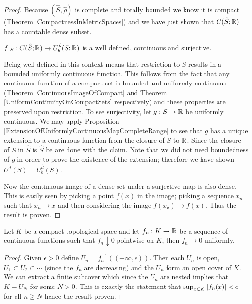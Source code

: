 \begin{proof}
Because $(\hat{S},\hat{\rho})$ is complete and totally bounded we know
it is compact (Theorem \ref{CompactnessInMetricSpaces}) and we have
just shown that $C(\hat{S} ; \mathbb{R})$ has a countable dense subset.

\begin{clm}$f\vert_S : C(\hat{S} ; \mathbb{R}) \to U_b^{\hat{\rho}}(S ;
\mathbb{R})$ is a well defined, continuous and surjective.
\end{clm}

Being well defined in this context means that restriction to $S$
results in a bounded uniformly continuous function.  This follows
from the fact that any continuous function of a compact set is bounded
and uniformly continuous (Theorem \ref{ContinuousImageOfCompact} and
Theorem \ref{UniformContinuityOnCompactSets} respectively) and these
properties are preserved upon restriction.  To see surjectivity, let
$g : S \to \mathbb{R}$ be uniformly continuous.  We may apply Proposition
\ref{ExtensionOfUniformlyContinuousMapCompleteRange} to see that $g$ has a unique extension
to a continuous function from the closure of $S$ to $\mathbb{R}$.  Since the closure of $S$ in $\hat{S}$ is
$\hat{S}$ be are done with the claim.  Note that we did not need boundedness of $g$ in order to prove the existence of the extension;
therefore we have shown $U^{\hat{d}}(S) = U^{\hat{d}}_b(S)$.

Now the continuous image of a dense set under a surjective map is also
dense.  This is easily seen by picking a point $f(x)$ in the image;
picking a sequence $x_n$ such that $x_n \to x$ and then considering
the image $f(x_n) \to f(x)$.  Thus the result is proven.
\end{proof}

\begin{lem}\label{DinisTheorem}Let $K$ be a compact
  topological space and let $f_n: K \to \mathbb{R}$ be a sequence  of continuous
  functions such that $f_n \downarrow 0$ pointwise on $K$, then $f_n
  \to 0$ uniformly.
\end{lem}
\begin{proof}
Given $\epsilon > 0$ define $U_n = f_n^{-1}((-\infty,\epsilon))$.
Then each
$U_n$ is open, $U_1 \subset U_2 \subset \dotsb$ (since the $f_n$ are
decreasing) and the $U_n$ form an open cover of $K$.  We can extract a
finite subcover which since the $U_n$ are nested implies that $K =
U_N$ for some $N > 0$.  This is exactly the statement that $\sup_{x
  \in K} \left \vert f_n(x) \right \vert < \epsilon$ for all $n \geq N$ hence the result proven.
\end{proof}

